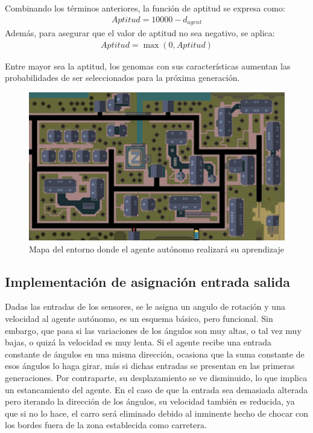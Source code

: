 \documentclass[lettersize, journal]{IEEEtran}
\begin{document}
Combinando los términos anteriores, la función de aptitud se expresa como:
\begin{align*} 
Aptitud = 10000 - d_{agent} 
\end{align*}
Además, para asegurar que el valor de aptitud no sea negativo, se aplica:
\begin{align*} 
Aptitud = \max(0, Aptitud) 
\end{align*}

Entre mayor sea la aptitud, los genomas con sus características aumentan las probabilidades de ser seleccionados para la próxima generación.
\begin{figure}
    \centering
    \includegraphics[scale=0.14]{images/gta2.png}
    \caption{Mapa del entorno donde el agente autónomo realizará su aprendizaje}
    \label{fig:Mapa}
\end{figure} 

\subsection{Implementación de asignación entrada  salida}
Dadas las entradas de los sensores, se le asigna un angulo de rotación y una velocidad al agente autónomo, es un esquema básico, pero funcional. %
Sin embargo, que pasa si las variaciones de los ángulos son muy altas, o tal vez muy bajas, o quizá la velocidad es muy lenta.
 Si el agente recibe una entrada constante de ángulos en una misma dirección, ocasiona que la suma constante de esos ángulos lo haga girar, más si dichas entradas se presentan en las primeras generaciones. Por contraparte, su desplazamiento se ve disminuido, lo que implica un estancamiento del agente. En el caso de que la entrada sea demasiada alterada pero iterando la dirección de los ángulos, su velocidad también es reducida, ya que si no lo hace, el carro será eliminado debido al inminente hecho de chocar con los bordes fuera de la zona establecida como carretera.
\end{document}
